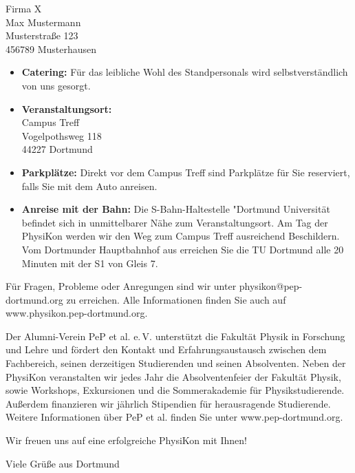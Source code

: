 \documentclass[
  pepbrief,
  fontsize=12pt,
  paper=a4,
  DIV=14,
  parskip=half,
  backaddress=false,
]{scrlttr2}
\begin{document}
\begin{letter}{%
  Firma X\\
  Max Mustermann\\
  Musterstraße 123\\
  456789 Musterhausen

}
\begin{itemize}
    \item \textbf{Catering:} Für das leibliche Wohl des Standpersonals wird selbstverständlich von uns gesorgt.
    \item \textbf{Veranstaltungsort:}
    \vspace{3mm}\\
    Campus Treff\\
    Vogelpothsweg 118\\
    44227 Dortmund
    \item \textbf{Parkplätze:} Direkt vor dem Campus Treff sind Parkplätze für Sie reserviert, falls Sie mit dem Auto anreisen.
    \item \textbf{Anreise mit der Bahn:} Die S-Bahn-Haltestelle "Dortmund Universität befindet sich in unmittelbarer Nähe zum Veranstaltungsort.
    Am Tag der PhysiKon werden wir den Weg zum Campus Treff ausreichend Beschildern.
    Vom Dortmunder Hauptbahnhof aus erreichen Sie die TU Dortmund alle 20 Minuten mit der S1 von Gleis 7.
\end{itemize}

Für Fragen, Probleme oder Anregungen sind wir unter physikon@pep-dortmund.org zu erreichen. Alle Informationen finden Sie auch auf www.physikon.pep-dortmund.org.

Der Alumni-Verein PeP et al. e.\,V. unterstützt die Fakultät Physik in Forschung und Lehre und fördert den Kontakt und Erfahrungsaustausch zwischen dem Fachbereich,
seinen derzeitigen Studierenden und seinen Absolventen. Neben der PhysiKon veranstalten wir jedes Jahr die Absolventenfeier der Fakultät Physik, sowie Workshops, Exkursionen
und die Sommerakademie für Physikstudierende. Außerdem finanzieren wir jährlich Stipendien für herausragende Studierende. Weitere Informationen über PeP et al. finden Sie unter
www.pep-dortmund.org.

Wir freuen uns auf eine erfolgreiche PhysiKon mit Ihnen!

\closing{Viele Grüße aus Dortmund}

\end{letter}
\end{document}

